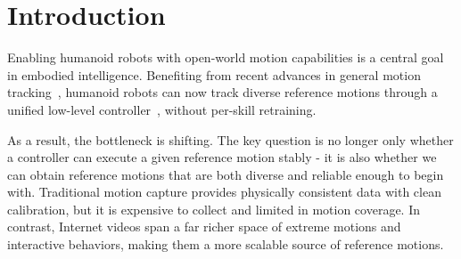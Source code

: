 \documentclass{article}
\begin{document}

\section{Introduction}

	

	





	Enabling humanoid robots with open-world motion capabilities is a central goal in embodied intelligence. Benefiting from recent advances in general motion tracking~\cite{}, humanoid robots can now track diverse reference motions through a unified low-level controller~\cite{}, without per-skill retraining.
	
	As a result, the bottleneck is shifting. The key question is no longer only whether a controller can execute a given reference motion stably - it is also whether we can obtain reference motions that are both diverse and reliable enough to begin with. Traditional motion capture provides physically consistent data with clean calibration, but it is expensive to collect and limited in motion coverage. In contrast, Internet videos span a far richer space of extreme motions and interactive behaviors, making them a more scalable source of reference motions.
	
\end{document}
